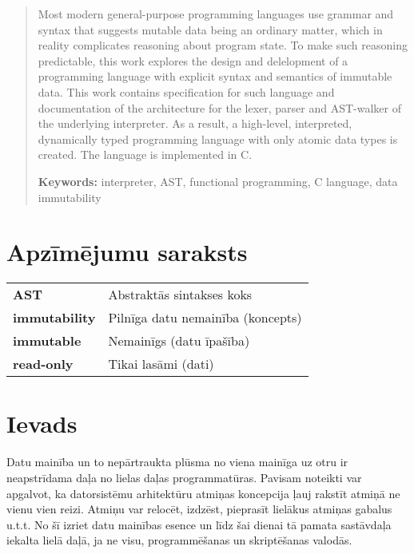 \documentclass[12pt,a4paper]{report}
\begin{document}
\begin{abstract}
    Most modern general-purpose programming languages use grammar and syntax that suggests mutable data being an ordinary matter, which in reality complicates reasoning about program state.
    To make such reasoning predictable, this work explores the design and delelopment of a programming language with explicit syntax and semantics of immutable data. 
    This work contains specification for such language and documentation of the architecture for the lexer, parser and AST-walker of the underlying interpreter.
    As a result, a high-level, interpreted, dynamically typed programming language with only atomic data types is created. The language is implemented in C.

    \begin{flushleft}
    \textbf{Keywords:} interpreter, AST, functional programming, C language, data immutability
    \end{flushleft}
\end{abstract} 

\tableofcontents

\newpage
\chapter*{Apzīmējumu saraksts}


\begin{tabular}{ll} 
\textbf{AST} & Abstraktās sintakses koks \\
\textbf{immutability} & Pilnīga datu nemainība (koncepts) \\
\textbf{immutable} & Nemainīgs (datu īpašība) \\
\textbf{read-only} & Tikai lasāmi (dati)
\end{tabular}


\newpage
\chapter*{Ievads}

Datu mainība un to nepārtraukta plūsma no viena mainīga uz otru ir neapstrīdama daļa no lielas daļas programmatūras. Pavisam noteikti var apgalvot, ka datorsistēmu arhitektūru atmiņas koncepcija ļauj rakstīt atmiņā ne vienu vien reizi. Atmiņu var relocēt, izdzēst, pieprasīt lielākus atmiņas gabalus u.t.t. No šī izriet datu mainības esence un līdz šai dienai tā pamata sastāvdaļa iekalta lielā daļā, ja ne visu, programmēšanas un skriptēšanas valodās.   
\end{document}
